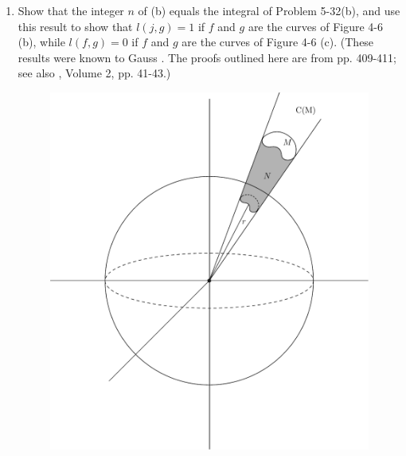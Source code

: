 \begin{problems}
{\begin{enumerate}[label=(\alph*)]
                where $r(x,y,z)=|(x,y,z)|$.
            \item Show that the integer $n$ of (b) equals the integral of Problem 5-32(b), 
                and use this result to show that $l(j,g) = 1$ if $f$ and $g$ are the curves 
                of Figure 4-6 (b), while $l(f,g) = 0$ if $f$ and $g$ are the curves of Figure 4-6 (c). 
                (These results were known to Gauss \cite{gaussNachlass}. The proofs outlined here 
                are from \cite{courant1937differential} pp. 409-411; see also \cite{maxwell1954electricity}, 
                Volume 2, pp. 41-43.)
                \begin{figure}[H]
                    \centering
                    \includegraphics[width=.65\linewidth]{./pics/Fig5-10.pdf}
                    \caption{}
                    \label{Fig 5-10}
                \end{figure}
        \end{enumerate}
    }
\end{problems}